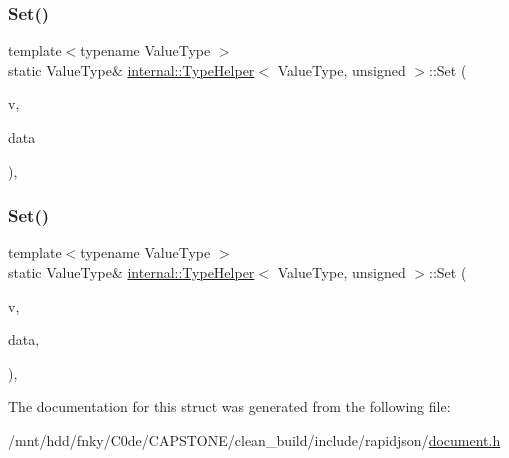 \mbox{\label{structinternal_1_1TypeHelper_3_01ValueType_00_01unsigned_01_4_a1d960542fd618ac649fe4e045c44f789}} 
\subsubsection{\texorpdfstring{Set()}{Set()}\hspace{0.1cm}{\footnotesize\ttfamily [1/2]}}
{\footnotesize\ttfamily template$<$typename Value\+Type $>$ \\
static Value\+Type\& \hyperlink{structinternal_1_1TypeHelper}{internal\+::\+Type\+Helper}$<$ Value\+Type, unsigned $>$\+::Set (\begin{DoxyParamCaption}\item[{Value\+Type \&}]{v,  }\item[{unsigned}]{data }\end{DoxyParamCaption})\hspace{0.3cm}{\ttfamily [inline]}, {\ttfamily [static]}}

\mbox{\label{structinternal_1_1TypeHelper_3_01ValueType_00_01unsigned_01_4_a601b05a233b6025486a9105d45d46780}} 
\subsubsection{\texorpdfstring{Set()}{Set()}\hspace{0.1cm}{\footnotesize\ttfamily [2/2]}}
{\footnotesize\ttfamily template$<$typename Value\+Type $>$ \\
static Value\+Type\& \hyperlink{structinternal_1_1TypeHelper}{internal\+::\+Type\+Helper}$<$ Value\+Type, unsigned $>$\+::Set (\begin{DoxyParamCaption}\item[{Value\+Type \&}]{v,  }\item[{unsigned}]{data,  }\item[{typename Value\+Type\+::\+Allocator\+Type \&}]{ }\end{DoxyParamCaption})\hspace{0.3cm}{\ttfamily [inline]}, {\ttfamily [static]}}



The documentation for this struct was generated from the following file\+:\begin{DoxyCompactItemize}
\item 
/mnt/hdd/fnky/\+C0de/\+C\+A\+P\+S\+T\+O\+N\+E/clean\+\_\+build/include/rapidjson/\hyperlink{document_8h}{document.\+h}\end{DoxyCompactItemize}
